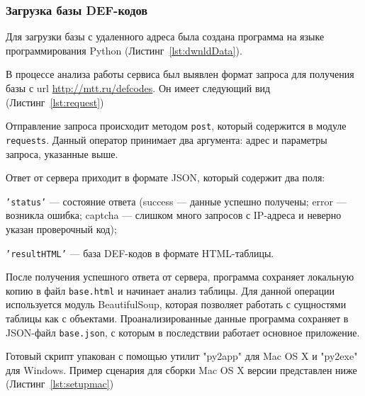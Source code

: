 \subsubsection{Загрузка базы DEF-кодов}

Для загрузки базы с удаленного адреса была создана программа на языке программирования Python (Листинг~\ref{lst:dwnldData}).

В процессе анализа работы сервиса был выявлен формат запроса для получения базы с url \url{http://mtt.ru/defcodes}. Он имеет следующий вид (Листинг~\ref{lst:request})


Отправление запроса происходит методом \texttt{post}, который содержится в модуле \texttt{requests}. Данный оператор принимает два аргумента: адрес и параметры запроса, указанные выше.

Ответ от сервера приходит в формате JSON, который содержит два поля:
\begin{enumerate*}
	\item \texttt{'status'} --- состояние ответа (success --- данные успешно получены; error --- возникла ошибка; captcha --- слишком много запросов с IP-адреса и неверно указан проверочный код);
	\item \texttt{'resultHTML'} --- база DEF-кодов в формате HTML-таблицы.
\end{enumerate*}
 
После получения успешного ответа от сервера, программа сохраняет локальную копию в файл \texttt{base.html} и начинает анализ таблицы. Для данной операции используется модуль BeautifulSoup, которая позволяет работать с сущностями таблицы как с объектами. Проанализированные данные программа сохраняет в JSON-файл \texttt{base.json}, с которым в последствии работает основное приложение.


Готовый скрипт упакован с помощью утилит "py2app" для Mac OS X и "py2exe" для Windows. Пример сценария для сборки Mac OS X версии представлен ниже (Листинг~\ref{lst:setupmac})

